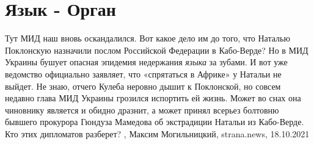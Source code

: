  
 
 
 
 
\chapter{Язык - Орган}
\label{sec:slova.jazyk.organ}

Тут МИД наш вновь оскандалился. Вот какое дело им до того, что Наталью
Поклонскую назначили послом Российской Федерации в Кабо-Верде? Но в МИД Украины
бушует опасная эпидемия недержания \emph{языка} за зубами. И вот уже ведомство
официально заявляет, что «спрятаться в Африке» у Натальи не выйдет.
Не знаю, отчего Кулеба неровно дышит к Поклонской, но совсем недавно глава МИД
Украины грозился испортить ей жизнь. Может во снах она чиновнику является и
обидно дразнит, а может принял всерьез болтовню бывшего прокурора Гюндуза
Мамедова об экстрадиции Натальи из Кабо-Верде. Кто этих дипломатов разберет?
, Максим Могильницкий, strana.news, 18.10.2021
